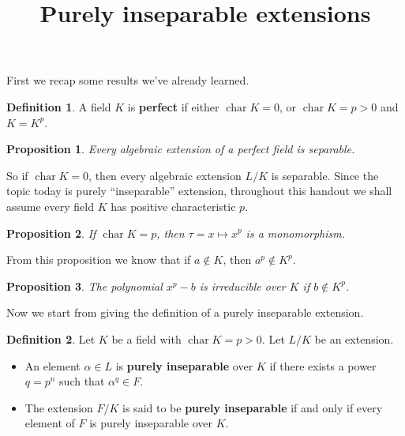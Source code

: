 \documentclass[a4paper]{article}
\title{Purely inseparable extensions}
\date{}
\DeclareMathOperator{\Char}{char}
\theoremstyle{mystyle}
\newtheorem{proposition}{Proposition}
\theoremstyle{remark}
\theoremstyle{definition}
\theoremstyle{definition}
\newtheorem{definition}{Definition}
\begin{document}
  \maketitle
  \vspace*{-2.5cm}

  First we recap some results we've already learned.
  \begin{definition}
    A field $K$ is {\bf perfect} if either $\Char K = 0$, or $\Char K = p > 0$ and $K = K^p$.
  \end{definition}

  \begin{proposition}
    Every algebraic extension of a perfect field is separable.
  \end{proposition}

  So if $\Char K = 0$, then every algebraic extension $L/K$ is separable.
  Since the topic today is purely ``inseparable'' extension, throughout this handout
  we shall assume every field $K$ has positive characteristic $p$.

  \begin{proposition} \label{prop:p-power-is-mono}
    If $\Char K = p$, then $\tau = x \mapsto x^p$ is a monomorphism.
  \end{proposition}

  From this proposition we know that if $a \not\in K$, then $a^p \not\in K^p$.

  \begin{proposition} \label{prop:p-power-is-irreducible}
    The polynomial $x^p - b$ is irreducible over $K$ if $b \not\in K^p$.
  \end{proposition}

  Now we start from giving the definition of a purely inseparable extension.

  \begin{definition}
    Let $K$ be a field with $\Char K = p > 0$. Let $L/K$ be an extension.

    \begin{itemize}
      \item An element $\alpha \in L$ is {\bf purely inseparable} over $K$ if
        there exists a power $q = p^n$ such that $\alpha^q \in F$.
      \item The extension $F/K$ is said to be {\bf purely inseparable} if and only if
        every element of $F$ is purely inseparable over $K$.
    \end{itemize}
  \end{definition}
\end{document}
